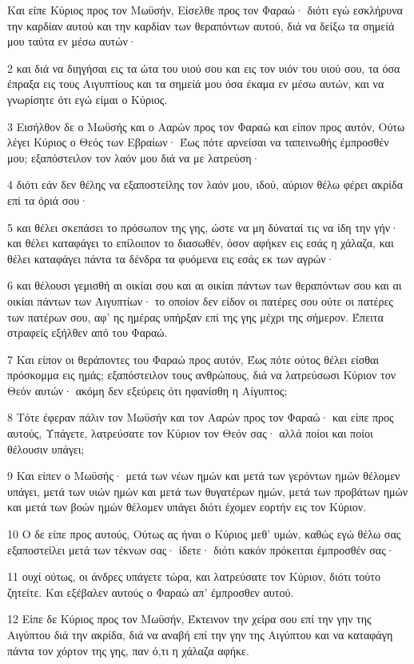 \par Και είπε Κύριος προς τον Μωϋσήν, Είσελθε προς τον Φαραώ· διότι εγώ εσκλήρυνα την καρδίαν αυτού και την καρδίαν των θεραπόντων αυτού, διά να δείξω τα σημείά μου ταύτα εν μέσω αυτών·
\par 2 και διά να διηγήσαι εις τα ώτα του υιού σου και εις τον υιόν του υιού σου, τα όσα έπραξα εις τους Αιγυπτίους και τα σημείά μου όσα έκαμα εν μέσω αυτών, και να γνωρίσητε ότι εγώ είμαι ο Κύριος.
\par 3 Εισήλθον δε ο Μωϋσής και ο Ααρών προς τον Φαραώ και είπον προς αυτόν, Ούτω λέγει Κύριος ο Θεός των Εβραίων· Έως πότε αρνείσαι να ταπεινωθής έμπροσθέν μου; εξαπόστειλον τον λαόν μου διά να με λατρεύση·
\par 4 διότι εάν δεν θέλης να εξαποστείλης τον λαόν μου, ιδού, αύριον θέλω φέρει ακρίδα επί τα όριά σου·
\par 5 και θέλει σκεπάσει το πρόσωπον της γης, ώστε να μη δύναταί τις να ίδη την γήν· και θέλει καταφάγει το επίλοιπον το διασωθέν, όσον αφήκεν εις εσάς η χάλαζα, και θέλει καταφάγει πάντα τα δένδρα τα φυόμενα εις εσάς εκ των αγρών·
\par 6 και θέλουσι γεμισθή αι οικίαι σου και αι οικίαι πάντων των θεραπόντων σου και αι οικίαι πάντων των Αιγυπτίων· το οποίον δεν είδον οι πατέρες σου ούτε οι πατέρες των πατέρων σου, αφ' ης ημέρας υπήρξαν επί της γης μέχρι της σήμερον. Έπειτα στραφείς εξήλθεν από του Φαραώ.
\par 7 Και είπον οι θεράποντες του Φαραώ προς αυτόν, Έως πότε ούτος θέλει είσθαι πρόσκομμα εις ημάς; εξαπόστειλον τους ανθρώπους, διά να λατρεύσωσι Κύριον τον Θεόν αυτών· ακόμη δεν εξεύρεις ότι ηφανίσθη η Αίγυπτος;
\par 8 Τότε έφεραν πάλιν τον Μωϋσήν και τον Ααρών προς τον Φαραώ· και είπε προς αυτούς, Υπάγετε, λατρεύσατε τον Κύριον τον Θεόν σας· αλλά ποίοι και ποίοι θέλουσιν υπάγει;
\par 9 Και είπεν ο Μωϋσής· μετά των νέων ημών και μετά των γερόντων ημών θέλομεν υπάγει, μετά των υιών ημών και μετά των θυγατέρων ημών, μετά των προβάτων ημών και μετά των βοών ημών θέλομεν υπάγει διότι έχομεν εορτήν εις τον Κύριον.
\par 10 Ο δε είπε προς αυτούς, Ούτως ας ήναι ο Κύριος μεθ' υμών, καθώς εγώ θέλω σας εξαποστείλει μετά των τέκνων σας· ίδετε· διότι κακόν πρόκειται έμπροσθέν σας·
\par 11 ουχί ούτως, οι άνδρες υπάγετε τώρα, και λατρεύσατε τον Κύριον, διότι τούτο ζητείτε. Και εξέβαλεν αυτούς ο Φαραώ απ' έμπροσθεν αυτού.
\par 12 Είπε δε Κύριος προς τον Μωϋσήν, Έκτεινον την χείρα σου επί την γην της Αιγύπτου διά την ακρίδα, διά να αναβή επί την γην της Αιγύπτου και να καταφάγη πάντα τον χόρτον της γης, παν ό,τι η χάλαζα αφήκε.
